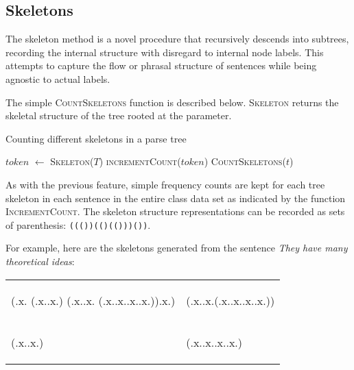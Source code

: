 \documentclass[conference]{IEEEtran}
\begin{document}
\subsection{Skeletons}

The skeleton method is a novel procedure that recursively descends into
subtrees, recording the internal structure with disregard to internal node
labels. This attempts to capture the flow or phrasal structure of sentences
while being agnostic to actual labels.

The simple \textsc{CountSkeletons} function is described below. \textsc{Skeleton}
returns the skeletal structure of the tree rooted at the parameter.

\begin{algorithm}
\caption{Counting different skeletons in a parse tree}
\begin{algorithmic}
    \State $token$ $\leftarrow$ \textsc{Skeleton}($T$)
    \State \textsc{incrementCount}($token$)
        \State \textsc{CountSkeletons}($t$)
    \EndFor
    \EndProcedure
\end{algorithmic}
\end{algorithm}

As with the previous feature, simple frequency counts are kept for each tree
skeleton in each sentence in the entire class data set as indicated by the
function \textsc{IncrementCount}. The skeleton structure representations can be
recorded as sets of parenthesis: \texttt{((())(()(()))())}.

For example, here are the skeletons generated from the sentence \emph{They have
many theoretical ideas}:

\begin{center}
\begin{tabular}{ll}
    \begin{parsetree}
        (.x.
          (.x..x.)
          (.x..x.
          (.x..x..x..x.)).x.)
    \end{parsetree} &
    \begin{parsetree}
        (.x..x.(.x..x..x..x.))
    \end{parsetree} \\
    \begin{parsetree}
        (.x..x.)
    \end{parsetree} &
    \begin{parsetree}
        (.x..x..x..x.)
    \end{parsetree} \\
\end{tabular}
\end{center}
\end{document}
